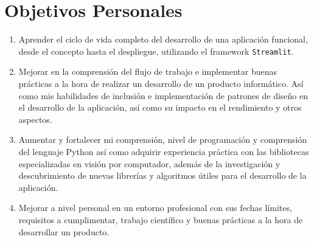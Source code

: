 \section {Objetivos Personales} 
\begin{enumerate}
\item Aprender el ciclo de vida completo del desarrollo de una aplicación funcional, desde el concepto hasta el despliegue, utilizando el framework \verb|Streamlit|. 
\item  Mejorar en la comprensión del flujo de trabajo  e implementar buenas prácticas a la hora de realizar un desarrollo de un producto informático. Así como  mis habilidades de inclusión e implementación de patrones de diseño en el desarrollo de la aplicación, así como su impacto en el rendimiento y otros aspectos.
\item Aumentar y fortalecer mi comprensión, nivel de programación y comprensión del lenguaje Python así como adquirir experiencia práctica con las bibliotecas especializadas en visión por computador, además de la investigación y descubrimiento de nuevas librerías y algoritmos útiles para el desarrollo de la aplicación.
\item Mejorar a nivel personal en un entorno profesional con sus fechas límites, requisitos a cumplimentar, trabajo científico y buenas prácticas a la hora de desarrollar un producto.

\end{enumerate}
